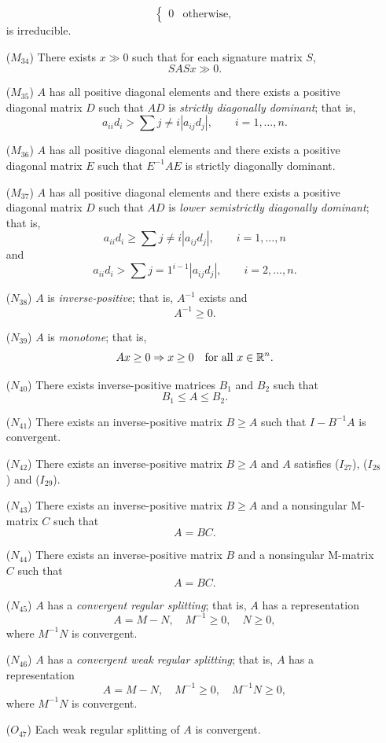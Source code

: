 \documentclass[aspectratio=169]{beamer}
\begin{document}
\begin{frame}
\begin{theorem}
\begin{enumerate}
\[\begin{cases}
0 & \textrm{otherwise,}
\end{cases}
\]
is irreducible.
\item[($M_{34}$)] There exists $x\gg 0$ such that for each signature matrix $S$,
\[
SASx\gg 0.
\]
\item[($M_{35}$)] $A$ has all positive diagonal elements and there exists a positive diagonal matrix $D$ such that $AD$ is \emph{strictly diagonally dominant}; that is,
\[
a_{ii}d_i>\sum{j\neq i}|a_{ij}d_j|,\qquad i=1,\ldots,n.
\]
\item[($M_{36}$)] $A$ has all positive diagonal elements and there exists a positive diagonal matrix $E$ such that $E^{-1}AE$ is strictly diagonally dominant.
\item[($M_{37}$)] $A$ has all positive diagonal elements and there exists a positive diagonal matrix $D$ such that $AD$ is \emph{lower semistrictly diagonally dominant}; that is,
\[
a_{ii}d_i\geq\sum{j\neq i}|a_{ij}d_j|,\qquad i=1,\ldots,n
\]
and
\[
a_{ii}d_i>\sum{j=1}^{i-1}|a_{ij}d_j|,\qquad i=2,\ldots,n.
\]
\item[($N_{38}$)] $A$ is \emph{inverse-positive}; that is, $A^{-1}$ exists and
\[
A^{-1}\geq 0.
\]
\item[($N_{39}$)] $A$ is \emph{monotone}; that is,
\[
Ax\geq 0\Rightarrow x\geq 0\quad\textrm{for all }x\in\mathbb{R}^n.
\]
\item[($N_{40}$)] There exists inverse-positive matrices $B_1$ and $B_2$ such that
\[
B_1\leq A\leq B_2.
\]
\item[($N_{41}$)] There exists an inverse-positive matrix $B\geq A$ such that $I-B^{-1}A$ is convergent.
\item[($N_{42}$)] There exists an inverse-positive matrix $B\geq A$ and $A$ satisfies ($I_{27}$), ($I_{28}$) and ($I_{29}$).
\item[($N_{43}$)] There exists an inverse-positive matrix $B\geq A$ and a nonsingular M-matrix $C$ such that
\[
A=BC.
\]
\item[($N_{44}$)] There exists an inverse-positive matrix $B$ and a nonsingular M-matrix $C$ such that
\[
A=BC.
\]
\item[($N_{45}$)] $A$ has a \emph{convergent regular splitting}; that is, $A$ has a representation 
\[
A=M-N,\quad M^{-1}\geq 0,\quad N\geq 0,
\]
where $M^{-1}N$ is convergent.
\item[($N_{46}$)] $A$ has a \emph{convergent weak regular splitting}; that is, $A$ has a representation
\[
A=M-N,\quad M^{-1}\geq 0,\quad M^{-1}N\geq 0,
\]
where $M^{-1}N$ is convergent.
\item[($O_{47}$)] Each weak regular splitting of $A$ is convergent.

\end{enumerate}
\end{theorem}
\end{frame}
\end{document}

